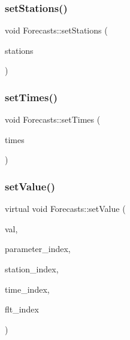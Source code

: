 \mbox{\label{class_forecasts_aeb1ca08f01a0ff5145607f8e962fb750}} 
\subsubsection{\texorpdfstring{set\+Stations()}{setStations()}}
{\footnotesize\ttfamily void Forecasts\+::set\+Stations (\begin{DoxyParamCaption}\item[{\mbox{\hyperlink{classanen_sta_1_1_stations}{anen\+Sta\+::\+Stations}}}]{stations }\end{DoxyParamCaption})}

\mbox{\label{class_forecasts_a85263c55dda71ef3363afbd2be337eed}} 
\subsubsection{\texorpdfstring{set\+Times()}{setTimes()}}
{\footnotesize\ttfamily void Forecasts\+::set\+Times (\begin{DoxyParamCaption}\item[{\mbox{\hyperlink{classanen_time_1_1_times}{anen\+Time\+::\+Times}}}]{times }\end{DoxyParamCaption})}

\mbox{\label{class_forecasts_a4ce21957ef296384b1e251098db953bc}} 
\subsubsection{\texorpdfstring{set\+Value()}{setValue()}\hspace{0.1cm}{\footnotesize\ttfamily [1/2]}}
{\footnotesize\ttfamily virtual void Forecasts\+::set\+Value (\begin{DoxyParamCaption}\item[{double}]{val,  }\item[{std\+::size\+\_\+t}]{parameter\+\_\+index,  }\item[{std\+::size\+\_\+t}]{station\+\_\+index,  }\item[{std\+::size\+\_\+t}]{time\+\_\+index,  }\item[{std\+::size\+\_\+t}]{flt\+\_\+index }\end{DoxyParamCaption})\hspace{0.3cm}{\ttfamily [pure virtual]}}



